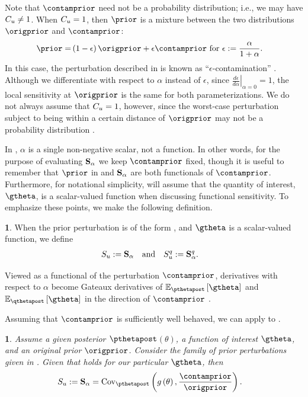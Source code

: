 \documentclass{article}\usepackage[]{graphicx}\usepackage[]{color}
\theoremstyle{plain}
\theoremstyle{definition}
\newtheorem{defn}[thm]{\protect\definitionname}
\theoremstyle{plain}
\theoremstyle{plain}
\theoremstyle{plain}
\newtheorem{prop}[thm]{\protect\propositionname}
\theoremstyle{plain}
\providecommand{\definitionname}{Definition}
\providecommand{\propositionname}{Proposition}
\begin{document}
Note that $\contamprior$ need not be a probability distribution;
i.e., we may have $C_{u}\ne1$. When $C_{u}=1$, then
$\prior$ is a mixture between the two distributions $\origprior$
and $\contamprior$:
\begin{align*}
\prior= & \left(1-\epsilon\right)\origprior+\epsilon\contamprior\textrm{ for }\epsilon:=\frac{\alpha}{1+\alpha}.
\end{align*}
In this case, the perturbation described in 
is known as ``$\epsilon$-contamination'' \citep{gustafson:2012:localrobustnessbook}.
Although we differentiate with respect to $\alpha$ instead of $\epsilon$,
since $\left.\frac{d\epsilon}{d\alpha}\right|_{\alpha=0}=1$, the
local sensitivity at $\origprior$ is the same for both parameterizations.
We do not always assume that $C_{u}=1$, however, since the
worst-case perturbation subject to being within a certain distance
of $\origprior$ may not be a probability distribution \citep{gustafson:1996:localposterior}.

In , $\alpha$ is a single non-negative
scalar, not a function. In other words, for the purpose of evaluating
$\mathbf{S}_{\alpha}$ we keep $\contamprior$ fixed, though it is useful to remember
that $\prior$ in  and $\mathbf{S}_{\alpha}$ are
both functionals of $\contamprior$. Furthermore, for notational simplicity,
will assume that the quantity of interest, $\gtheta$, is a scalar-valued
function when discussing functional sensitivity. To emphasize these
points, we make the following definition.
\begin{defn}
When the prior perturbation is of the form ,
and $\gtheta$ is a scalar-valued function, we define
\begin{align*}
S_{u}:=\mathbf{S}_{\alpha} & \quad\textrm{and}\quad S_{u}^{q}:=\mathbf{S}_{\alpha}^{q}.
\end{align*}
\end{defn}

Viewed as a functional of the perturbation $\contamprior$, derivatives
with respect to $\alpha$ become Gateaux derivatives of $\epgtheta$
and $\eqgtheta$ in the direction of $\contamprior$ \citep[Section 2.5]{huber:2011:robust}.

Assuming that $\contamprior$ is sufficiently well behaved, we can
apply  to .
\begin{prop}
\label{prop:mcmc_epsilon_sensitivity}Assume a given posterior $\pthetapost$$\left(\theta\right)$,
a function of interest $\gtheta$, and an original prior $\origprior$.
Consider the family of prior perturbations given in .
Given that  holds for our particular
$\gtheta$, then
\begin{align}
\psensfunc & :=\psens=\cov_{\pthetapost}\left(g\left(\theta\right),\frac{\contamprior}{\origprior}\right).\label{eq:mcmc_epsilon_sensitivity}
\end{align}
\end{prop}
\end{document}
